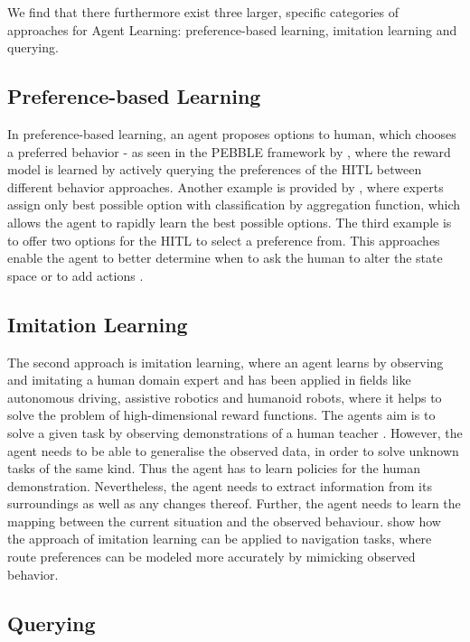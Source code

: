 \documentclass[twoside,11pt]{article}
\begin{document}
We find that there furthermore exist three larger, specific categories of approaches for Agent Learning: preference-based learning, imitation learning and querying.

\subsection{Preference-based Learning}

In preference-based learning, an agent proposes options to human, which chooses a preferred behavior - as seen in the PEBBLE framework by \cite{LeeSmithAbbeel:2021:FeedbackPreferenceHITLLearningPEBBLE}, where the reward model is learned by actively querying the preferences of the HITL between different behavior approaches. Another example is provided by \cite{HudecEtAl-2021-Interpretable}, where experts assign only best possible option with classification by aggregation function, which allows the agent to rapidly learn the best possible options. The third example is to offer two options for the HITL to select a preference from. This approaches enable the agent to better determine when to ask the human to alter the state space or to add actions \cite{MandelEtAl:2017ActionsInHITL}.

\subsection{Imitation Learning}

The second approach is imitation learning, where an agent learns by observing and imitating a human domain expert and has been applied in fields like autonomous driving, assistive robotics and humanoid robots, where it helps to solve the problem of high-dimensional reward functions. The agents aim is to solve a given task by observing demonstrations of a human teacher \cite{HusseinEtAl:2017:ImitationLearning}. However, the agent needs to be able to generalise the observed data, in order to solve unknown tasks of the same kind. Thus the agent has to learn policies for the human demonstration. Nevertheless, the agent needs to extract information from its surroundings as well as any changes thereof. Further, the agent needs to learn the mapping between the current situation and the observed behaviour. \cite{ZiebartEtAl:2008:ImitationLearningNavigation} show how the approach of imitation learning can be applied to navigation tasks, where route preferences can be modeled more accurately by mimicking observed behavior.

\subsection{Querying}
\end{document}
